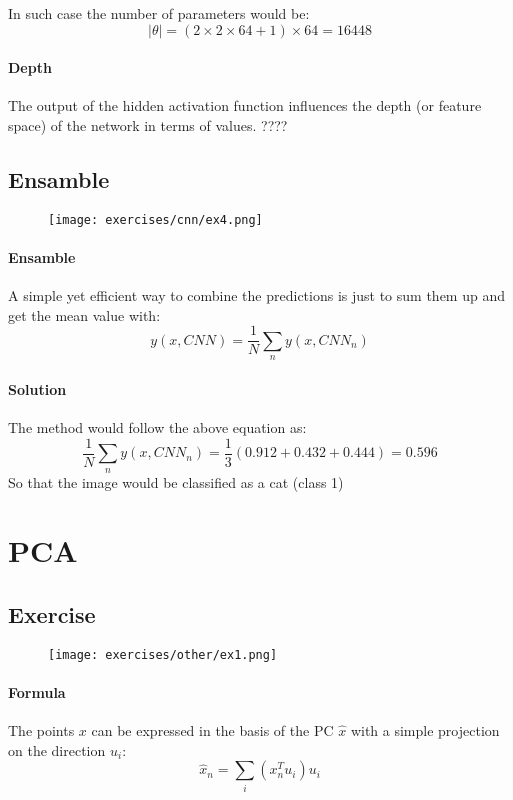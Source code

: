 In such case the number of parameters would be:
$$|\theta|=(2\times 2\times 64 +1)\times 64=16448$$


\paragraph{Depth}
The output of the hidden activation function influences the depth (or feature space) of the network in terms of values. ????

\subsection{Ensamble}
\begin{figure}[H]
    \centering
    \texttt{[image: exercises/cnn/ex4.png]}
\end{figure}

\paragraph{Ensamble}
A simple yet efficient way to combine the predictions is just to sum them up and get the mean value with:
$$y(x,CNN)=\frac{1}{N}\sum_n y(x,CNN_n)$$

\paragraph{Solution}
The method would follow the above equation as:
$$\frac{1}{N}\sum_n y(x,CNN_n)=\frac{1}{3}(0.912+0.432+0.444)=0.596$$
So that the image would be classified as a cat (class 1)


\section{PCA}

\subsection{Exercise}

\begin{figure}[H]
    \centering
    \texttt{[image: exercises/other/ex1.png]}
\end{figure}

\paragraph{Formula}
The points  $x$ can be expressed in the basis of the PC $\hat{x}$ with a simple projection on the direction $u_i$:
$$\hat{x}_n=\sum_i(x^T_nu_i)u_i$$

